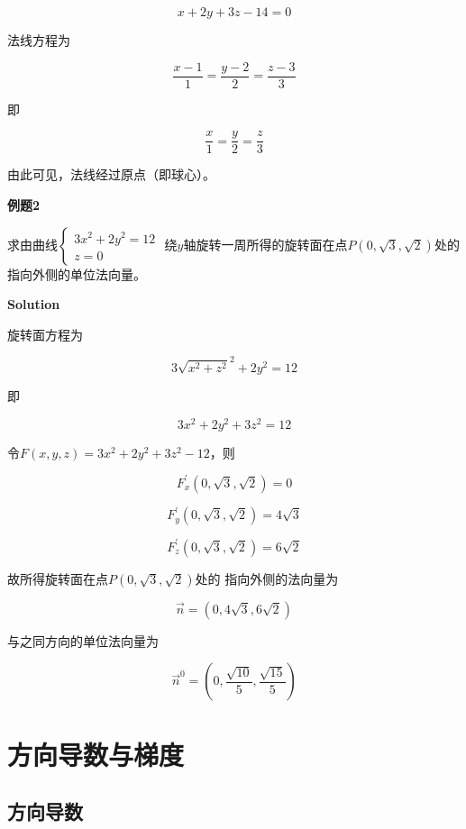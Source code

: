 \documentclass[12pt, a4paper]{article}
\numberwithin{equation}{section}
\begin{document}
    $$
        x+2 y+3 z-14=0
    $$

    法线方程为

    $$
        \frac{x-1}{1}=\frac{y-2}{2}=\frac{z-3}{3}
    $$

    即

    $$
        \frac{x}{1}=\frac{y}{2}=\frac{z}{3}
    $$

    由此可见，法线经过原点（即球心）。
    \vspace{1em}

    \textbf{例题2}

    求由曲线$\left\{\begin{array}{l}3 x^2+2 y^2=12 \\ z=0\end{array}\right.$
    绕\(y\)轴旋转一周所得的旋转面在点\(P\left(0,\sqrt{3},\sqrt{2}\right)\)处的
    指向外侧的单位法向量。
    \vspace{1em}

    \textbf{Solution}
    \vspace{1em}

    旋转面方程为

    \[
        3 \sqrt{x^2+z^2}^2+2 y^2 = 12
    \]

    即

    \[
        3 x^2+2 y^2 +3z^2= 12
    \]

    令\(F\left(x,y,z\right)=3 x^2+2 y^2 +3z^2 -12\)，则

    $$
        F_x^{\prime}(0, \sqrt{3}, \sqrt{2})=0
    $$

    $$
        F_y^{\prime}(0, \sqrt{3}, \sqrt{2})=4\sqrt{3}
    $$

    $$
        F_z^{\prime}(0, \sqrt{3}, \sqrt{2})=6\sqrt{2}
    $$

    故所得旋转面在点\(P\left(0,\sqrt{3},\sqrt{2}\right)\)处的
    指向外侧的法向量为

    \[
        \overrightarrow{n} = \left(0,4\sqrt{3},6\sqrt{2}\right)
    \]

    与之同方向的单位法向量为

    \[
        \overrightarrow{n}^0 = \left(0,\frac{\sqrt{10}}{5},\frac{\sqrt{15}}{5}\right)
    \]

\section{方向导数与梯度}

\subsection{方向导数}
\end{document}
